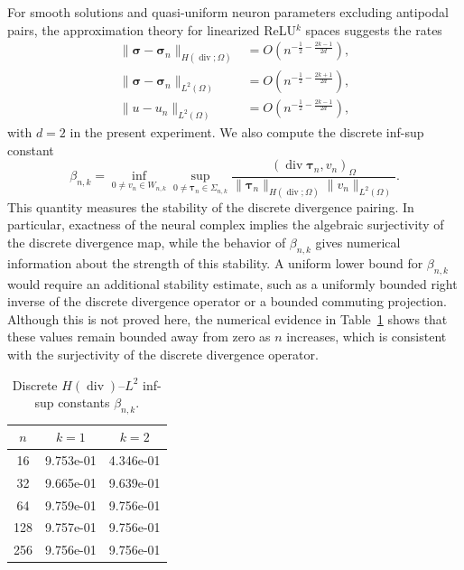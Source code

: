 \documentclass[pdflatex,sn-mathphys-num]{sn-jnl}
\numberwithin{equation}{section}
\numberwithin{theorem}{section}
\numberwithin{table}{section}
\numberwithin{figure}{section}
\begin{document}
For smooth solutions and quasi-uniform neuron parameters excluding antipodal pairs, the approximation theory for linearized ReLU$^k$ spaces suggests the rates
\[
\begin{aligned}
    \|\boldsymbol{\sigma}-\boldsymbol{\sigma}_{n}\|_{H(\operatorname{div};\Omega)}
    &=
    O\left(n^{-\frac12-\frac{2k-1}{2d}}\right),\\
    \|\boldsymbol{\sigma}-\boldsymbol{\sigma}_{n}\|_{L^2(\Omega)}
    &=
    O\left(n^{-\frac12-\frac{2k+1}{2d}}\right),\\
    \|u-u_n\|_{L^2(\Omega)}
    &=
    O\left(n^{-\frac12-\frac{2k-1}{2d}}\right),
    \end{aligned}
\]
with \(d=2\) in the present experiment. We also compute the discrete inf-sup constant
\begin{equation}
\label{eq:discrete-infsup}
    \beta_{n,k}
    =
    \inf_{0\neq v_n\in W_{n,k}}
    \sup_{0\neq \boldsymbol{\tau}_n\in \Sigma_{n,k}}
    \frac{
    (\operatorname{div}\boldsymbol{\tau}_n,v_n)_{\Omega}
    }{
    \|\boldsymbol{\tau}_n\|_{H(\operatorname{div};\Omega)}
    \|v_n\|_{L^2(\Omega)}
    } .
\end{equation}
This quantity measures the stability of the discrete divergence pairing.  In particular, exactness of the neural complex implies the algebraic surjectivity of the discrete divergence map, while the behavior of \(\beta_{n,k}\) gives numerical information about the strength of this stability. A uniform lower bound for $\beta_{n,k}$ would require an additional stability estimate, such as a uniformly bounded right inverse of the discrete divergence operator or a bounded commuting projection. Although this is not proved here, the numerical evidence in Table~\ref{tab:mixpoissoninfsup} shows that these values remain bounded away from zero as $n$ increases, which is consistent with the surjectivity of the discrete divergence operator.

\begin{table}[!htbp]
\centering
\setlength{\tabcolsep}{1cm}
\caption{Discrete $H(\operatorname{div})$--$L^2$ inf-sup constants $\beta_{n,k}$.}
\label{tab:mixpoissoninfsup}
\begin{tabular}{c|cc}
\hline
$n$ & $k=1$ & $k=2$ \\
\hline
16 & 9.753e-01 & 4.346e-01 \\
32 & 9.665e-01 & 9.639e-01 \\
64 & 9.759e-01 & 9.756e-01 \\
128 & 9.757e-01 & 9.756e-01 \\
256 & 9.756e-01 & 9.756e-01 \\
\hline
\end{tabular}
\end{table}
\end{document}

